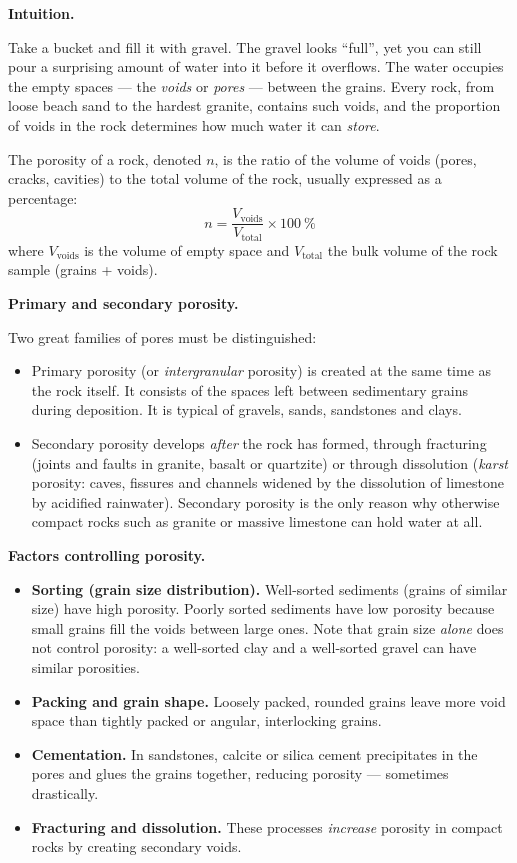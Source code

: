 \documentclass[11pt]{article}
\newcommand{\cle}[1]{{\popxbold\color{popdark}#1}}
\newcounter{popsec}
\newcounter{popsub}
\newcommand{\courssub}[1]{%
  \stepcounter{popsub}%
  \par\vspace{9pt}\noindent{\popxbold\fontsize{11.5}{13}\selectfont\color{popink}{\color{poporange}\thepopsec.\thepopsub}\hspace{6pt}#1}\par\nopagebreak\vspace{4pt}
}
\begin{document}
\courssub{Porosity: the Storage Capacity of Rocks}

\textbf{Intuition.}\par
Take a bucket and fill it with gravel. The gravel looks ``full'', yet you can still pour a surprising amount of water into it before it overflows. The water occupies the empty spaces — the \emph{voids} or \emph{pores} — between the grains. Every rock, from loose beach sand to the hardest granite, contains such voids, and the proportion of voids in the rock determines how much water it can \emph{store}.

\begin{definition}[Porosity]
The \cle{porosity} of a rock, denoted $n$, is the ratio of the volume of voids (pores, cracks, cavities) to the total volume of the rock, usually expressed as a percentage:
\[ n = \frac{V_{\text{voids}}}{V_{\text{total}}} \times 100\ \% \]
where $V_{\text{voids}}$ is the volume of empty space and $V_{\text{total}}$ the bulk volume of the rock sample (grains + voids).
\end{definition}

\textbf{Primary and secondary porosity.}\par
Two great families of pores must be distinguished:
\begin{itemize}
\item \cle{Primary porosity} (or \emph{intergranular} porosity) is created at the same time as the rock itself. It consists of the spaces left between sedimentary grains during deposition. It is typical of gravels, sands, sandstones and clays.
\item \cle{Secondary porosity} develops \emph{after} the rock has formed, through fracturing (joints and faults in granite, basalt or quartzite) or through dissolution (\emph{karst} porosity: caves, fissures and channels widened by the dissolution of limestone by acidified rainwater). Secondary porosity is the only reason why otherwise compact rocks such as granite or massive limestone can hold water at all.
\end{itemize}

\textbf{Factors controlling porosity.}\par
\begin{itemize}
\item \textbf{Sorting (grain size distribution).} Well-sorted sediments (grains of similar size) have high porosity. Poorly sorted sediments have low porosity because small grains fill the voids between large ones. Note that grain size \emph{alone} does not control porosity: a well-sorted clay and a well-sorted gravel can have similar porosities.
\item \textbf{Packing and grain shape.} Loosely packed, rounded grains leave more void space than tightly packed or angular, interlocking grains.
\item \textbf{Cementation.} In sandstones, calcite or silica cement precipitates in the pores and glues the grains together, reducing porosity — sometimes drastically.
\item \textbf{Fracturing and dissolution.} These processes \emph{increase} porosity in compact rocks by creating secondary voids.
\end{itemize}
\end{document}

